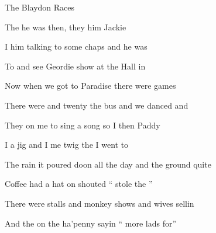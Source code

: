 \begin{SBSong}{The Blaydon Races}
\begin{SBVerse}
    The  he was  then, they  him Jackie 
    
    I  him talking to some chaps and  he was 
    
    To  and see Geordie  show at the  Hall in 
  \end{SBVerse}
  \CBPageBrk
  \begin{SBVerse}
    Now when we got to Paradise there were  games 
    
    There were  and twenty  the bus and  we danced and 
    
    They  on me to sing a song so I  then Paddy 
    
    I  a jig and I  me twig the  I went to 
  \end{SBVerse}
  \begin{SBVerse}
    The rain it poured doon all the day and  the ground quite 
    
    Coffee  had a  hat on shouted `` stole the ''
    
    There were  stalls and monkey shows and  wives sellin 
    
    And the  on the ha'penny  sayin `` more lads for''
  \end{SBVerse}
\end{SBSong}


